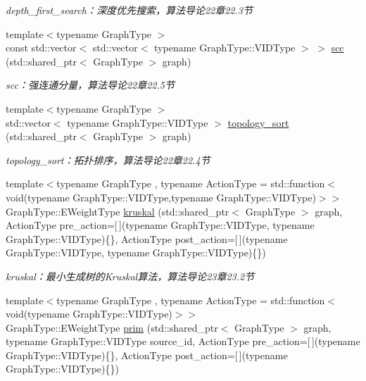\begin{DoxyCompactItemize}
\begin{DoxyCompactList}\small\item\em depth\+\_\+first\+\_\+search：深度优先搜索，算法导论22章22.3节 \end{DoxyCompactList}\item 
{\footnotesize template$<$typename Graph\+Type $>$ }\\const std\+::vector$<$ std\+::vector$<$ typename Graph\+Type\+::\+V\+I\+D\+Type $>$ $>$ \hyperlink{namespace_introduction_to_algorithm_1_1_graph_algorithm_a6d058c2aaa8714778b3f2ab8a24ff232}{scc} (std\+::shared\+\_\+ptr$<$ Graph\+Type $>$ graph)
\begin{DoxyCompactList}\small\item\em scc：强连通分量，算法导论22章22.5节 \end{DoxyCompactList}\item 
{\footnotesize template$<$typename Graph\+Type $>$ }\\std\+::vector$<$ typename Graph\+Type\+::\+V\+I\+D\+Type $>$ \hyperlink{namespace_introduction_to_algorithm_1_1_graph_algorithm_a804241e72be5f4c031190bc12a6b73a2}{topology\+\_\+sort} (std\+::shared\+\_\+ptr$<$ Graph\+Type $>$ graph)
\begin{DoxyCompactList}\small\item\em topology\+\_\+sort：拓扑排序，算法导论22章22.4节 \end{DoxyCompactList}\item 
{\footnotesize template$<$typename Graph\+Type , typename Action\+Type  = std\+::function$<$ void(typename Graph\+Type\+::\+V\+I\+D\+Type,typename Graph\+Type\+::\+V\+I\+D\+Type)$>$$>$ }\\Graph\+Type\+::\+E\+Weight\+Type \hyperlink{namespace_introduction_to_algorithm_1_1_graph_algorithm_a2575c09c42d0b30b57702c9379d2fbfb}{kruskal} (std\+::shared\+\_\+ptr$<$ Graph\+Type $>$ graph, Action\+Type pre\+\_\+action=\mbox{[}$\,$\mbox{]}(typename Graph\+Type\+::\+V\+I\+D\+Type, typename Graph\+Type\+::\+V\+I\+D\+Type)\{\}, Action\+Type post\+\_\+action=\mbox{[}$\,$\mbox{]}(typename Graph\+Type\+::\+V\+I\+D\+Type, typename Graph\+Type\+::\+V\+I\+D\+Type)\{\})
\begin{DoxyCompactList}\small\item\em kruskal：最小生成树的\+Kruskal算法，算法导论23章23.2节 \end{DoxyCompactList}\item 
{\footnotesize template$<$typename Graph\+Type , typename Action\+Type  = std\+::function$<$ void(typename Graph\+Type\+::\+V\+I\+D\+Type)$>$$>$ }\\Graph\+Type\+::\+E\+Weight\+Type \hyperlink{namespace_introduction_to_algorithm_1_1_graph_algorithm_aba1581358d79ba82dc4fd0c15bc987e6}{prim} (std\+::shared\+\_\+ptr$<$ Graph\+Type $>$ graph, typename Graph\+Type\+::\+V\+I\+D\+Type source\+\_\+id, Action\+Type pre\+\_\+action=\mbox{[}$\,$\mbox{]}(typename Graph\+Type\+::\+V\+I\+D\+Type)\{\}, Action\+Type post\+\_\+action=\mbox{[}$\,$\mbox{]}(typename Graph\+Type\+::\+V\+I\+D\+Type)\{\})

\end{DoxyCompactItemize}
